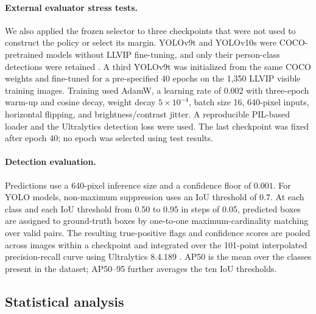 \documentclass[preprint,11pt]{elsarticle}
\begin{document}
\paragraph{External evaluator stress tests.}
We also applied the frozen selector to three checkpoints that were not used to
construct the policy or select its margin. YOLOv9t and YOLOv10s were
COCO-pretrained models without LLVIP fine-tuning, and only their person-class
detections were retained \cite{wang2024yolov9,wang2024yolov10}. A third
YOLOv9t was initialized from the same COCO weights and fine-tuned for a
pre-specified 40 epochs on the 1,350 LLVIP visible training images. Training
used AdamW, a learning rate of 0.002 with three-epoch warm-up and cosine decay,
weight decay \(5\times10^{-4}\), batch size 16, 640-pixel inputs, horizontal
flipping, and brightness/contrast jitter. A reproducible PIL-based loader and
the Ultralytics detection loss were used. The last checkpoint was fixed after
epoch 40; no epoch was selected using test results.

\paragraph{Detection evaluation.}
Predictions use a 640-pixel inference size and a confidence floor of
\(0.001\). For YOLO models, non-maximum suppression uses an IoU threshold of
\(0.7\). At each class and each IoU threshold from 0.50 to 0.95 in steps of
0.05, predicted boxes are assigned to ground-truth boxes by one-to-one
maximum-cardinality matching over valid pairs. The resulting true-positive
flags and confidence scores are pooled across images within a checkpoint and
integrated over the 101-point interpolated precision-recall curve using
Ultralytics 8.4.189 \cite{jocher2026ultralytics}. AP50 is the mean over the
classes present in the dataset; AP50--95 further averages the ten IoU
thresholds.

\subsection{Statistical analysis}
\end{document}
